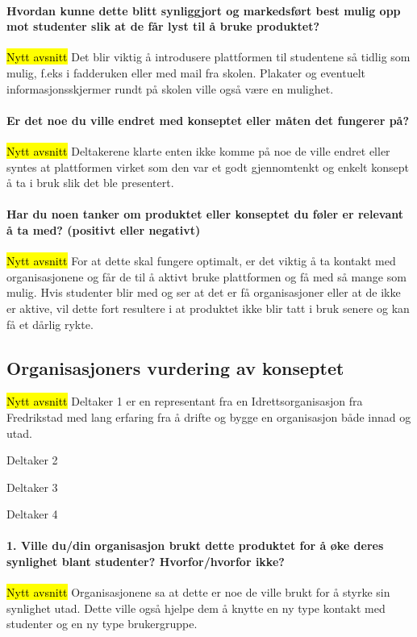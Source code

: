 \paragraph{Hvordan kunne dette blitt synliggjort og markedsført best mulig opp mot studenter slik at de får lyst til å bruke produktet?}
\hl{Nytt avsnitt}
Det blir viktig å introdusere plattformen til studentene så tidlig som mulig, f.eks i fadderuken eller med mail fra skolen. Plakater og eventuelt informasjonsskjermer rundt på skolen ville også være en mulighet.

\paragraph{Er det noe du ville endret med konseptet eller måten det fungerer på?}
\hl{Nytt avsnitt}
Deltakerene klarte enten ikke komme på noe de ville endret eller syntes at plattformen virket som den var et godt gjennomtenkt og enkelt konsept å ta i bruk slik det ble presentert.

\paragraph{Har du noen tanker om produktet eller konseptet du føler er relevant å ta med? (positivt eller negativt)}
\hl{Nytt avsnitt}
For at dette skal fungere optimalt, er det viktig å ta kontakt med organisasjonene og får de til å aktivt bruke plattformen og få med så mange som mulig. Hvis studenter blir med og ser at det er få organisasjoner eller at de ikke er aktive, vil dette fort resultere i at produktet ikke blir tatt i bruk senere og kan få et dårlig rykte. 


\subsection{Organisasjoners vurdering av konseptet}
\hl{Nytt avsnitt}
Deltaker 1 er en representant fra en Idrettsorganisasjon fra Fredrikstad med lang erfaring fra å drifte og bygge en organisasjon både innad og utad.

Deltaker 2

Deltaker 3

Deltaker 4

\paragraph{1. Ville du/din organisasjon brukt dette produktet for å øke deres synlighet blant studenter? Hvorfor/hvorfor ikke?}
\hl{Nytt avsnitt}
Organisasjonene sa at dette er noe de ville brukt for å styrke sin synlighet utad. Dette ville også hjelpe dem å knytte en ny type kontakt med studenter og en ny type brukergruppe.

